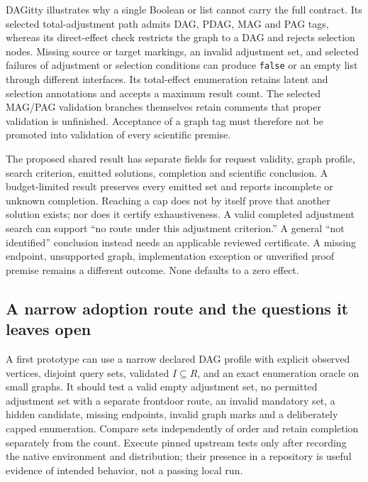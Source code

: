 DAGitty illustrates why a single Boolean or list cannot carry the full
contract. Its selected total-adjustment path admits DAG, PDAG, MAG and PAG
tags, whereas its direct-effect check restricts the graph to a DAG and rejects
selection nodes. Missing source or target markings, an invalid adjustment set,
and selected failures of adjustment or selection conditions can produce
\texttt{false} or an empty list through different interfaces. Its total-effect
enumeration retains latent and selection annotations and accepts a maximum
result count. The selected MAG/PAG validation branches themselves retain
comments that proper validation is unfinished. Acceptance of a graph tag must
therefore not be promoted into validation of every scientific premise.
\citep{exec19_otherid_dagitty}

The proposed shared result has separate fields for request validity, graph
profile, search criterion, emitted solutions, completion and scientific
conclusion. A budget-limited result preserves every emitted set and reports
incomplete or unknown completion. Reaching a cap does not by itself prove that
another solution exists; nor does it certify exhaustiveness. A valid completed
adjustment search can support ``no route under this adjustment criterion.''
A general ``not identified'' conclusion instead needs an applicable reviewed
certificate. A missing endpoint, unsupported graph, implementation exception
or unverified proof premise remains a different outcome. None defaults to a
zero effect.~\citep{exec19_otherid_julia,exec19_otherid_dagitty,exec19_otherid_reference}

\subsection{A narrow adoption route and the questions it leaves open}
\label{exec19:otherid-route}
A first prototype can use a narrow declared DAG profile with explicit observed
vertices, disjoint query sets, validated $I\subseteq R$, and an exact
enumeration oracle on small graphs. It should test a valid empty adjustment
set, no permitted adjustment set with a separate frontdoor route, an invalid
mandatory set, a hidden candidate, missing endpoints, invalid graph marks and
a deliberately capped enumeration. Compare sets independently of order and
retain completion separately from the count. Execute pinned upstream tests only
after recording the native environment and distribution; their presence in a
repository is useful evidence of intended behavior, not a passing local run.
\citep{exec19_otherid_julia,exec19_otherid_dagitty}

